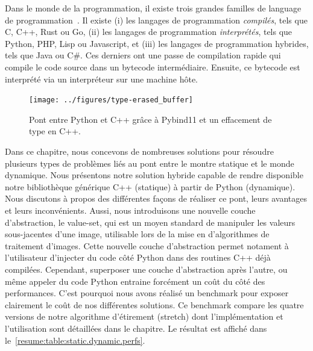 Dans le monde de la programmation, il existe trois grandes familles de language de
programmation~\parencite{prechelt.2000.comparison}. Il existe (i) les langages de programmation \emph{compilés}, tels
que C, C++, Rust ou Go, (ii) les langages de programmation \emph{interprétés}, tels que Python, PHP, Lisp ou Javascript,
et (iii) les langages de programmation hybrides, tels que Java ou C\#. Ces derniers ont une passe de compilation rapide
qui compile le code source dans un bytecode intermédiaire. Ensuite, ce bytecode est interprété via un interpréteur sur
une machine hôte.

\begin{figure}[htbp]
  \centering
  \texttt{[image: ../figures/type-erased\_buffer]}
  \caption[]{Pont entre Python et C++ grâce à Pybind11 et un effacement de type en C++.}
  \label{resume:fig:type-erased.buffer}
\end{figure}

Dans ce chapitre, nous concevons de nombreuses solutions pour résoudre plusieurs types de problèmes liés au pont entre
le montre statique et le monde dynamique. Nous présentons notre solution hybride capable de rendre disponible notre
bibliothèque générique C++ (statique) à partir de Python (dynamique). Nous discutons à propos des différentes façons de
réaliser ce pont, leurs avantages et leurs inconvénients. Aussi, nous introduisons une nouvelle couche d'abstraction, le
value-set, qui est un moyen standard de manipuler les valeurs sous-jacentes d'une image, utilisable lors de la mise en
\oeuvre d'algorithmes de traitement d'images. Cette nouvelle couche d'abstraction permet notament à l'utilisateur
d'injecter du code côté Python dans des routines C++ déjà compilées. Cependant, superposer une couche d'abstraction
après l'autre, ou même appeler du code Python entraine forcément un coût du côté des performances. C'est pourquoi nous
avons réalisé un benchmark pour exposer clairement le coût de nos différentes solutions. Ce benchmark compare les quatre
versions de notre algorithme d'étirement (stretch) dont l'implémentation et l'utilisation sont détaillées dans le
chapitre. Le résultat est affiché dans le~\cref{resume:table:static.dynamic.perfs}.

